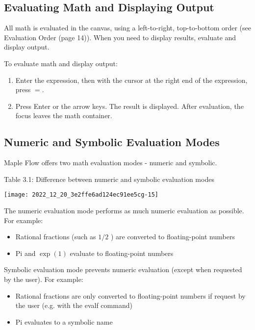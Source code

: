 \subsection{Evaluating Math and Displaying Output}
All math is evaluated in the canvas, using a left-to-right, top-to-bottom order (see Evaluation Order (page 14)). When you need to display results, evaluate and display output.

To evaluate math and display output:

\begin{enumerate}
  \item Enter the expression, then with the cursor at the right end of the expression, press $=$.

  \item Press Enter or the arrow keys. The result is displayed. After evaluation, the focus leaves the math container.

\end{enumerate}

\subsection{Numeric and Symbolic Evaluation Modes}
Maple Flow offers two math evaluation modes - numeric and symbolic.

Table 3.1: Difference between numeric and symbolic evaluation modes

\begin{center}
\texttt{[image: 2022\_12\_20\_3e2ffe6ad124ec91ee5cg-15]}
\end{center}

The numeric evaluation mode performs as much numeric evaluation as possible. For example:

\begin{itemize}
  \item Rational fractions (such as $1 / 2$ ) are converted to floating-point numbers

  \item Pi and $\exp (1)$ evaluate to floating-point numbers

\end{itemize}

Symbolic evaluation mode prevents numeric evaluation (except when requested by the user). For example:

\begin{itemize}
  \item Rational fractions are only converted to floating-point numbers if request by the user (e.g. with the evalf command)

  \item Pi evaluates to a symbolic name

\end{itemize}

